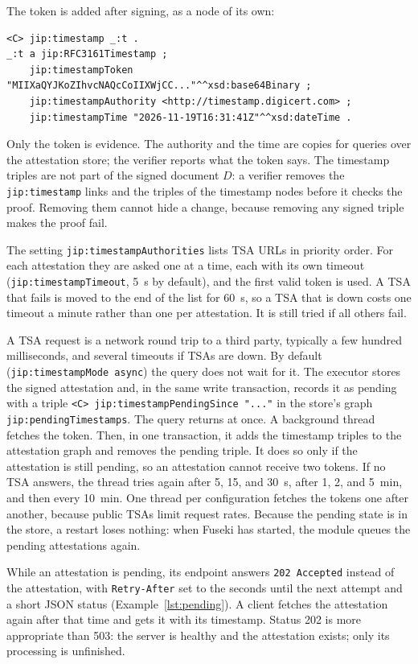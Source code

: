 \documentclass[11pt,a4paper]{article}
\newcommand{\code}[1]{\texttt{#1}}
\begin{document}
The token is added after signing, as a node of its own:
\begin{lstlisting}[language=Turtle, numbers=none]
<C> jip:timestamp _:t .
_:t a jip:RFC3161Timestamp ;
    jip:timestampToken "MIIXaQYJKoZIhvcNAQcCoIIXWjCC..."^^xsd:base64Binary ;
    jip:timestampAuthority <http://timestamp.digicert.com> ;
    jip:timestampTime "2026-11-19T16:31:41Z"^^xsd:dateTime .
\end{lstlisting}
Only the token is evidence. The authority and the time are copies for queries over the
attestation store; the verifier reports what the token says. The timestamp triples are not part
of the signed document $D$: a verifier removes the \code{jip:timestamp} links and the triples
of the timestamp nodes before it checks the proof. Removing them cannot hide a change, because
removing any signed triple makes the proof fail.

The setting \code{jip:timestampAuthorities} lists TSA URLs in priority order. For each
attestation they are asked one at a time, each with its own timeout
(\code{jip:timestampTimeout}, 5~s by default), and the first valid token is used. A TSA that
fails is moved to the end of the list for 60~s, so a TSA that is down costs one timeout a
minute rather than one per attestation. It is still tried if all others fail.

A TSA request is a network round trip to a third party, typically a few hundred milliseconds,
and several timeouts if TSAs are down. By default (\code{jip:timestampMode async}) the query
does not wait for it. The executor stores the signed attestation and, in the same write
transaction, records it as pending with a triple
\code{<C> jip:timestampPendingSince "..."} in the store's graph
\code{jip:pendingTimestamps}. The query returns at once. A background thread fetches the token.
Then, in one transaction, it adds the timestamp triples to the attestation graph and removes
the pending triple. It does so only if the attestation is still pending, so an attestation
cannot receive two tokens. If no TSA answers, the thread tries again after 5, 15, and 30~s, after 1, 2, and
5~min, and then every 10~min. One thread per configuration fetches the tokens one after another,
because public TSAs limit request rates. Because the pending state is in the store, a restart
loses nothing: when Fuseki has started, the module queues the pending attestations again.

While an attestation is pending, its endpoint answers \code{202 Accepted} instead of the
attestation, with \code{Retry-After} set to the seconds until the next attempt and a short JSON
status (Example~\ref{lst:pending}). A client fetches the attestation again after that time and
gets it with its timestamp. Status 202 is more appropriate than 503: the server is healthy
and the attestation exists; only its processing is unfinished.
\end{document}
